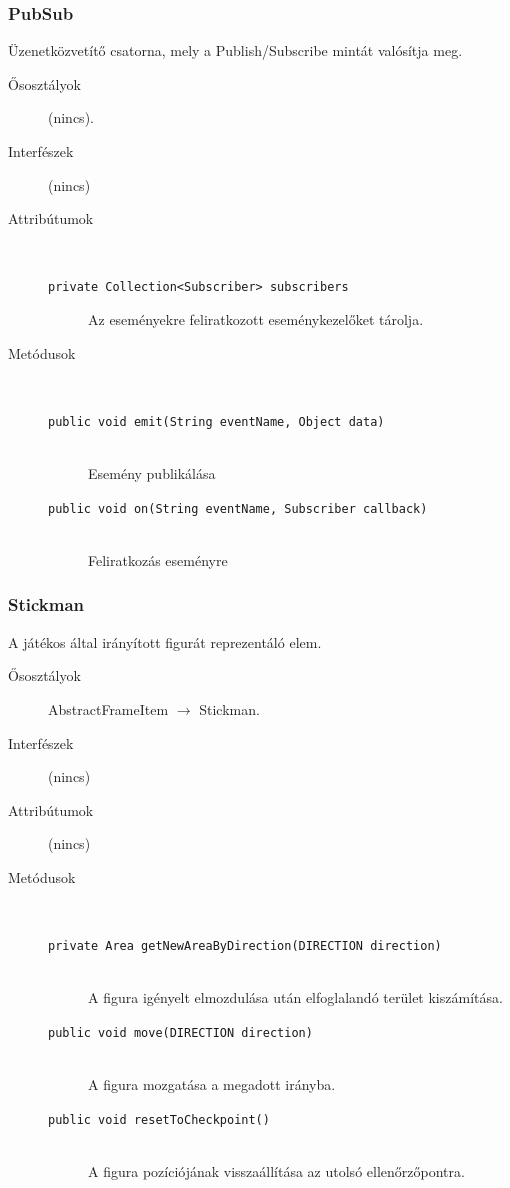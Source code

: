 		\subsubsection{PubSub}
				 Üzenetközvetítő csatorna, mely a Publish/Subscribe mintát valósítja meg. 			\begin{description}


				\item[Ősosztályok] (nincs).
				\item[Interfészek] (nincs)
				\item[Attribútumok]$\ $
					\begin{description}
						\item[\texttt{private Collection<Subscriber> subscribers}] Az eseményekre feliratkozott eseménykezelőket tárolja. 
					\end{description}
				\item[Metódusok]$\ $
					\begin{description}
						\item[\texttt{public void emit(String eventName, Object data)}] \hfill \\ Esemény publikálása 
						\item[\texttt{public void on(String eventName, Subscriber callback)}] \hfill \\ Feliratkozás eseményre 
					\end{description}
			\end{description}

		\subsubsection{Stickman}
				 A játékos által irányított figurát reprezentáló elem. 			\begin{description}


				\item[Ősosztályok] AbstractFrameItem $\rightarrow{}$ Stickman.
				\item[Interfészek] (nincs)
				\item[Attribútumok] (nincs)
				\item[Metódusok]$\ $
					\begin{description}
						\item[\texttt{private Area getNewAreaByDirection(DIRECTION direction)}] \hfill \\ A figura igényelt elmozdulása után elfoglalandó  terület kiszámítása. 
						\item[\texttt{public void move(DIRECTION direction)}] \hfill \\ A figura mozgatása a megadott irányba. 
						\item[\texttt{public void resetToCheckpoint()}] \hfill \\ A figura pozíciójának visszaállítása az  utolsó ellenőrzőpontra. 
					\end{description}
			\end{description}

